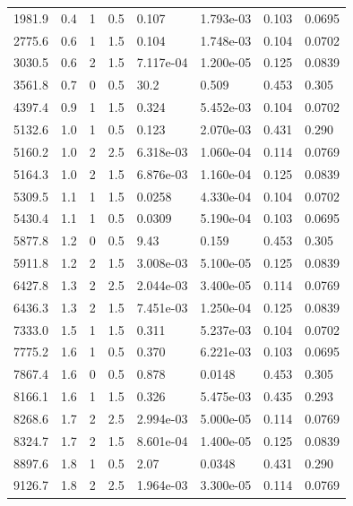 \documentclass[preview]{standalone}
\begin{document}
{{\begin{tabular}{L{1.2cm}C{1.2cm} C{0.3cm}C{0.5cm} C{1.4cm}C{1.4cm} C{1.4cm}C{1.4cm}}
  1981.9  &   0.4  & 1     & 0.5 &  0.107  & 1.793e-03  & 0.103 &  0.0695   \\ 
  2775.6  &   0.6  & 1     & 1.5 &  0.104  & 1.748e-03  & 0.104 &  0.0702   \\ 
  3030.5  &   0.6  & 2     & 1.5 &  7.117e-04  & 1.200e-05  & 0.125 &  0.0839   \\ 
  3561.8  &   0.7  & 0     & 0.5 &  30.2  & 0.509  & 0.453 &  0.305   \\ 
  4397.4  &   0.9  & 1     & 1.5 &  0.324  & 5.452e-03  & 0.104 &  0.0702   \\ 
  5132.6  &   1.0  & 1     & 0.5 &  0.123  & 2.070e-03  & 0.431 &  0.290   \\ 
  5160.2  &   1.0  & 2     & 2.5 &  6.318e-03  & 1.060e-04  & 0.114 &  0.0769   \\ 
  5164.3  &   1.0  & 2     & 1.5 &  6.876e-03  & 1.160e-04  & 0.125 &  0.0839   \\ 
  5309.5  &   1.1  & 1     & 1.5 &  0.0258  & 4.330e-04  & 0.104 &  0.0702   \\ 
  5430.4  &   1.1  & 1     & 0.5 &  0.0309  & 5.190e-04  & 0.103 &  0.0695   \\ 
  5877.8  &   1.2  & 0     & 0.5 &  9.43  & 0.159  & 0.453 &  0.305   \\ 
  5911.8  &   1.2  & 2     & 1.5 &  3.008e-03  & 5.100e-05  & 0.125 &  0.0839   \\ 
  6427.8  &   1.3  & 2     & 2.5 &  2.044e-03  & 3.400e-05  & 0.114 &  0.0769   \\ 
  6436.3  &   1.3  & 2     & 1.5 &  7.451e-03  & 1.250e-04  & 0.125 &  0.0839   \\ 
  7333.0  &   1.5  & 1     & 1.5 &  0.311  & 5.237e-03  & 0.104 &  0.0702   \\ 
  7775.2  &   1.6  & 1     & 0.5 &  0.370  & 6.221e-03  & 0.103 &  0.0695   \\ 
  7867.4  &   1.6  & 0     & 0.5 &  0.878  & 0.0148  & 0.453 &  0.305   \\ 
  8166.1  &   1.6  & 1     & 1.5 &  0.326  & 5.475e-03  & 0.435 &  0.293   \\ 
  8268.6  &   1.7  & 2     & 2.5 &  2.994e-03  & 5.000e-05  & 0.114 &  0.0769   \\ 
  8324.7  &   1.7  & 2     & 1.5 &  8.601e-04  & 1.400e-05  & 0.125 &  0.0839   \\ 
  8897.6  &   1.8  & 1     & 0.5 &  2.07  & 0.0348  & 0.431 &  0.290   \\ 
  9126.7  &   1.8  & 2     & 2.5 &  1.964e-03  & 3.300e-05  & 0.114 &  0.0769   \\ 

\end{tabular}}}
\end{document}
